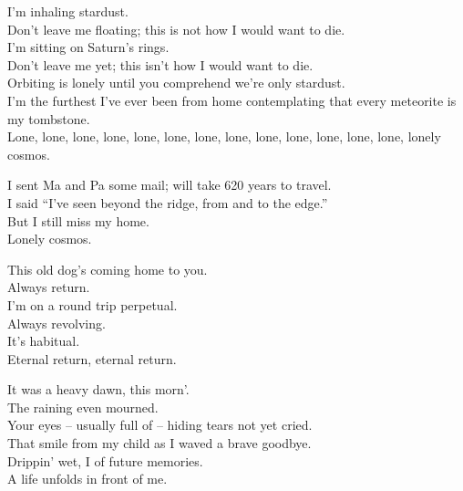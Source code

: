 
I'm inhaling stardust. \\
Don't leave me floating; this is not how I would want to die. \\
I'm sitting on Saturn's rings. \\
Don't leave me yet; this isn't how I would want to die. \\
Orbiting is lonely until you comprehend we're only stardust. \\
I'm the furthest I've ever been from home contemplating that every meteorite is my tombstone. \\
Lone, lone, lone, lone, lone, lone, lone, lone, lone, lone, lone, lone, lone, lonely cosmos. \\


I sent Ma and Pa some mail; will take 620 years to travel. \\
I said ``I've seen beyond the ridge, from  and to the edge.'' \\
But I still miss my home. \\
Lonely cosmos. \\





This old dog's coming home to you. \\
Always return. \\
I'm on a round trip perpetual. \\
Always revolving. \\
It's habitual. \\
Eternal return, eternal return. \\


It was a heavy dawn, this morn'. \\
The raining  even mourned. \\
Your eyes -- usually full of  -- hiding tears not yet cried. \\
That smile from my child as I waved a brave goodbye. \\
Drippin' wet, I  of future memories. \\
A life unfolds in front of me. \\

